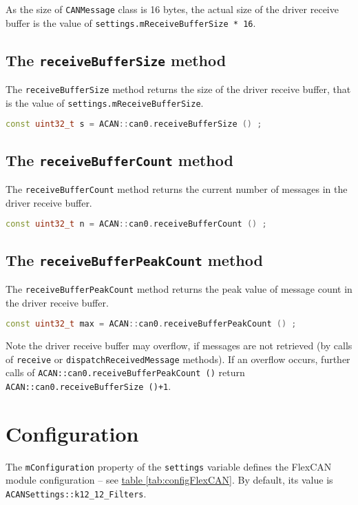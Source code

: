 \documentclass[10pt, a4paper, obeyspaces, openany]{extarticle}
\newcommand \sectionLabel[2]{\section{#1}\label{sec:#2}}
\newcommand\refTableau[1]{\hyperref[tab:#1]{table \ref*{tab:#1}}}
\begin{document}
As the size of \texttt{CANMessage} class is 16 bytes, the actual size of the driver receive buffer is the value of \texttt{settings.mReceiveBufferSize * 16}.


\subsection{The \texttt{receiveBufferSize} method}

The \texttt{receiveBufferSize} method returns the size of the driver receive buffer, that is the value of \texttt{settings.mReceiveBufferSize}.
{ \small\begin{lstlisting}[language=c++]
const uint32_t s = ACAN::can0.receiveBufferSize () ;
\end{lstlisting}}


\subsection{The \texttt{receiveBufferCount} method}

The \texttt{receiveBufferCount} method returns the current number of messages in the driver receive buffer.
{ \small\begin{lstlisting}[language=c++]
const uint32_t n = ACAN::can0.receiveBufferCount () ;
\end{lstlisting}}


\subsection{The \texttt{receiveBufferPeakCount} method}

The \texttt{receiveBufferPeakCount} method returns the peak value of message count in the driver receive buffer.
{ \small\begin{lstlisting}[language=c++]
const uint32_t max = ACAN::can0.receiveBufferPeakCount () ;
\end{lstlisting}}

Note the driver receive buffer may overflow, if messages are not retrieved (by calls of \texttt{receive} or \texttt{dispatchReceivedMessage} methods). If an overflow occurs, further calls of \texttt{ACAN::can0.receiveBufferPeakCount ()} return \texttt{ACAN::can0.receiveBufferSize ()+1}.








\sectionLabel{Configuration}{FlexCANconfiguration}

The \texttt{mConfiguration} property of the \texttt{settings} variable defines the FlexCAN module configuration -- see \refTableau {configFlexCAN}. By default, its value is \texttt{ACANSettings::k12\_12\_Filters}.
\end{document}
